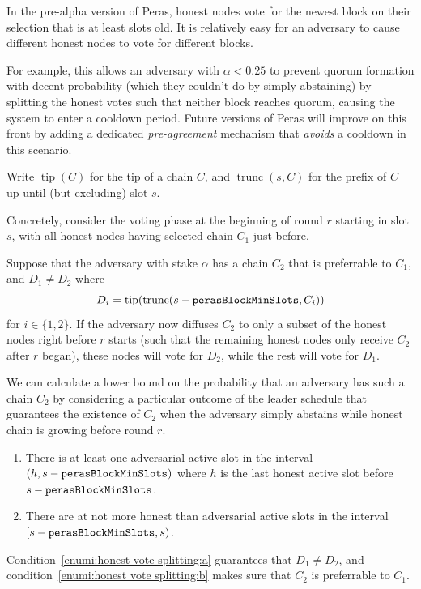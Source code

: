 In the pre-alpha version of Peras, honest nodes vote for the newest block on their selection that is at least \perasBlockMinSlots{} slots old.
It is relatively easy for an adversary to cause different honest nodes to vote for different blocks.

For example, this allows an adversary with $\alpha<0.25$ to prevent quorum formation with decent probability (which they couldn't do by simply abstaining) by splitting the honest votes such that neither block reaches quorum, causing the system to enter a cooldown period.
Future versions of Peras will improve on this front by adding a dedicated \emph{pre-agreement} mechanism that \emph{avoids} a cooldown in this scenario.

Write $\operatorname{tip}(C)$ for the tip of a chain $C$, and $\operatorname{trunc}(s,C)$ for the prefix of $C$ up until (but excluding) slot $s$.

Concretely, consider the voting phase at the beginning of round $r$ starting in slot $s$, with all honest nodes having selected chain $C_1$ just before.

Suppose that the adversary with stake $\alpha$ has a chain $C_2$ that is preferrable to $C_1$, and $D_1 \neq D_2$ where \[D_i = \operatorname{tip}(\operatorname{trunc}(s-\mathtt{perasBlockMinSlots},C_i))\] for $i\in\{1,2\}$.
If the adversary now diffuses $C_2$ to only a subset of the honest nodes right before $r$ starts (such that the remaining honest nodes only receive $C_2$ after $r$ began), these nodes will vote for $D_2$, while the rest will vote for $D_1$.

We can calculate a lower bound on the probability that an adversary has such a chain $C_2$ by considering a particular outcome of the leader schedule that guarantees the existence of $C_2$ when the adversary simply abstains while honest chain is growing before round $r$.

\begin{enumerate}
\item\label{enumi:honest vote splitting:a}
  There is at least one adversarial active slot in the interval $(h,s-\mathtt{perasBlockMinSlots})$ where $h$ is the last honest active slot before $s-\mathtt{perasBlockMinSlots}$.
\item\label{enumi:honest vote splitting:b}
  There are at not more honest than adversarial active slots in the interval $[s-\mathtt{perasBlockMinSlots}, s)$.
\end{enumerate}
Condition~\ref{enumi:honest vote splitting:a} guarantees that $D_1\neq D_2$, and condition~\ref{enumi:honest vote splitting:b} makes sure that $C_2$ is preferrable to $C_1$.

